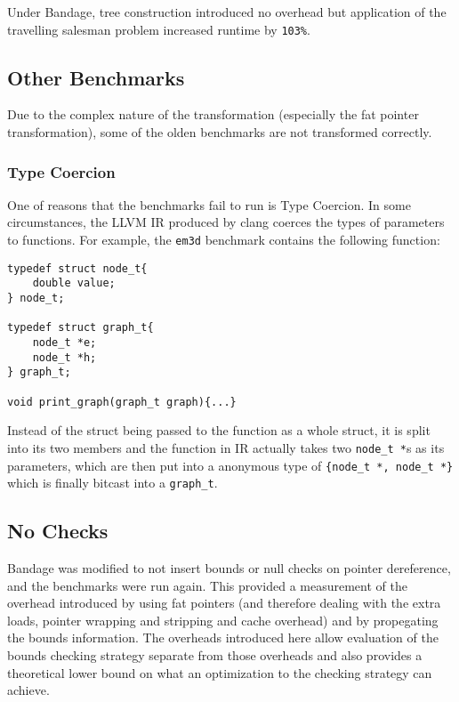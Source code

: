 Under Bandage, tree construction introduced no overhead but application of the travelling salesman problem increased runtime by \verb!103%!.

\subsection{Other Benchmarks}

Due to the complex nature of the transformation (especially the fat pointer transformation), some of the olden benchmarks are not transformed correctly.

\subsubsection{Type Coercion}

One of reasons that the benchmarks fail to run is Type Coercion.
In some circumstances, the LLVM IR produced by clang coerces the types of parameters to functions.
For example, the \verb!em3d! benchmark contains the following function:

\begin{verbatim}
typedef struct node_t{
    double value;
} node_t;

typedef struct graph_t{
    node_t *e;
    node_t *h;
} graph_t;

void print_graph(graph_t graph){...}
\end{verbatim}

Instead of the struct being passed to the function as a whole struct, it is split into its two members and the function in IR actually takes two \verb!node_t *!s as its parameters, which are then put into a anonymous type of \verb!{node_t *, node_t *}! which is finally bitcast into a \verb!graph_t!.

\subsection{No Checks}

Bandage was modified to not insert bounds or null checks on pointer dereference, and the benchmarks were run again.
This provided a measurement of the overhead introduced by using fat pointers (and therefore dealing with the extra loads, pointer wrapping and stripping and cache overhead) and by propegating the bounds information.
The overheads introduced here allow evaluation of the bounds checking strategy separate from those overheads and also provides a theoretical lower bound on what an optimization to the checking strategy can achieve.

